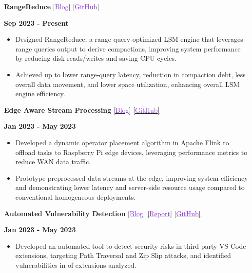 \documentclass[11pt,a4paper,calibri]{moderncv}
\begin{document}
\mediumspace{}

\textbf{RangeReduce} \href{https://shubhamkaushik.com/projects/designing_range_query_aware_log_structured_merge_tree/}{[\textcolor{blueviolet}{Blog}]} \href{https://github.com/SSD-Brandeis/LSMQueryDrivenCompaction}{[\textcolor{blueviolet}{GitHub}]} \hfill \raggedright{\textbf{Sep 2023 - Present}}
\begin{itemize}[left=4pt, topsep=0pt, itemsep=0pt, parsep=0.5pt]
    \item Designed RangeReduce, a range query-optimized LSM engine that leverages range queries output to derive compactions, improving system performance by reducing disk reads/writes and saving CPU-cycles.
    \item Achieved up to  lower range-query latency,  reduction in compaction debt,  less overall data movement, and  lower space utilization, enhancing overall LSM engine efficiency.
\end{itemize}

\mediumspace{}

\textbf{Edge Aware Stream Processing} \href{https://shubhamkaushik.com/projects/heterogeneity_aware_operator_placement_for_stream_processing_systems_at_the_edge/}{[\textcolor{blueviolet}{Blog}]} \href{https://github.com/shubham-sudo/HeterogeneityAwareOperatorPlacementforStreamProcessingSystemsAtEdge-RaspberryPi}{[\textcolor{blueviolet}{GitHub}]} \hfill \raggedright{\textbf{Jan 2023 - May 2023}}
\begin{itemize}[left=4pt, topsep=0pt, itemsep=0pt, parsep=0.5pt]
    \item Developed a dynamic operator placement algorithm in Apache Flink to offload tasks to Raspberry Pi edge devices, leveraging performance metrics to reduce WAN data traffic.
    \item Prototype preprocessed data streams at the edge, improving system efficiency and demonstrating lower latency and server-side resource usage compared to conventional homogeneous deployments.
\end{itemize}

\mediumspace{}

\textbf{Automated Vulnerability Detection} \href{https://shubhamkaushik.com/projects/finding_vulnuerbilities_in_VS_Code_extensions/}{[\textcolor{blueviolet}{Blog}]} \href{https://shubhamkaushik.com/assets/pdf/vulnerabilities_in_vs_code.pdf}{[\textcolor{blueviolet}{Report}]} \href{https://github.com/prateekdceit06/VSCode-Extensions-Simulator}{[\textcolor{blueviolet}{GitHub}]} \hfill \raggedright{\textbf{Jan 2023 - May 2023}}
\begin{itemize}[left=4pt, topsep=0pt, itemsep=0pt, parsep=0.5pt]
    \item Developed an automated tool to detect security risks in third-party VS Code extensions, targeting Path Traversal and Zip Slip attacks, and identified vulnerabilities in  of extensions analyzed.
\end{itemize}
\end{document}

